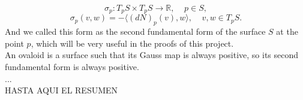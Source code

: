 $$ \sigma_p : T_pS \times T_pS \to \mathbb{R}, \;\;\;\; p \in S, $$
$$ \sigma_p(v,w) = - \langle (dN)_p(v), w \rangle, \;\;\;\; v,w \in T_pS. $$
And we called this form as the second fundamental form of the surface $S$ at the point $p$, which will be very useful in the proofs of this project.
${ }$\\

An ovaloid is a surface such that its Gauss map is always positive, so its second fundamental form is always positive.
${ }$\\

...
${ }$\\

HASTA AQUI EL RESUMEN
${ }$\\




















